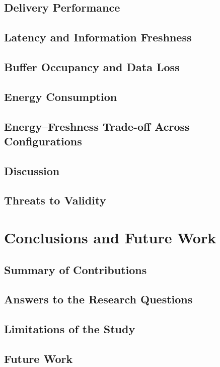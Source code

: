 \section{Delivery Performance}
\section{Latency and Information Freshness}
\section{Buffer Occupancy and Data Loss}
\section{Energy Consumption}
\section{Energy--Freshness Trade-off Across Configurations}
\section{Discussion}
\section{Threats to Validity}


\chapter{Conclusions and Future Work}

\section{Summary of Contributions}
\section{Answers to the Research Questions}
\section{Limitations of the Study}
\section{Future Work}
